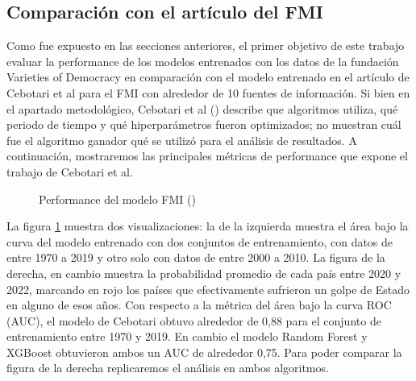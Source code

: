 \documentclass{article}
\begin{document}
\subsection{Comparación con el artículo del FMI}

Como fue expuesto en las secciones anteriores, el primer objetivo de este trabajo evaluar la performance
de los modelos entrenados con los datos de la fundación Varieties of Democracy en comparación con el modelo
entrenado en el artículo de Cebotari et al para el FMI con alrededor de 10 fuentes de información. Si bien
en el apartado metodológico, Cebotari et al (\citeyear{Ceb24}) describe que algoritmos utiliza, qué periodo
de tiempo y qué hiperparámetros fueron optimizados; no muestran cuál fue el algoritmo ganador qué se utilizó
para el análisis de resultados. A continuación, mostraremos las principales métricas de performance que
expone el trabajo de Cebotari et al.

\begin{figure}[H]
  \centering
  \caption{Performance del modelo FMI (\cite{Ceb24}) \label{fig:metricas_cebotari}}
\end{figure}

La figura \ref{fig:metricas_cebotari} muestra dos visualizaciones: la de la izquierda muestra el área
bajo la curva del modelo entrenado con dos conjuntos de entrenamiento, con datos de entre 1970 a 2019
y otro solo con datos de entre 2000 a 2010. La figura de la derecha, en cambio muestra la probabilidad
promedio de cada país entre 2020 y 2022, marcando en rojo los países que efectivamente sufrieron un
golpe de Estado en alguno de esos años. Con respecto a la métrica del área bajo la curva ROC (AUC), el 
modelo de Cebotari obtuvo alrededor de 0,88 para el conjunto de entrenamiento entre 1970 y 2019. En
cambio el modelo Random Forest y XGBoost obtuvieron ambos un AUC de alrededor 0,75. Para poder comparar
la figura de la derecha replicaremos el análisis en ambos algoritmos.
\end{document}
